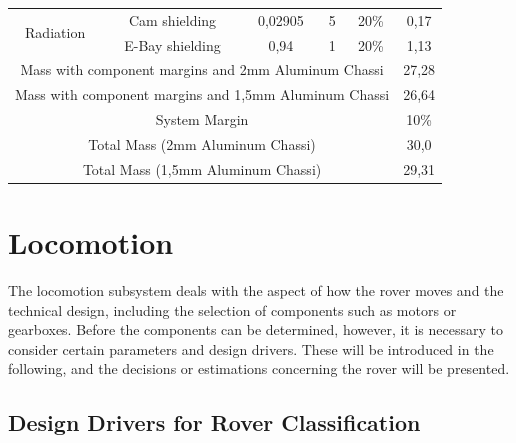\begin{table}[]
{\begin{tabular}{cccccc}
\multirow{2}{*}{Radiation}               & Cam shielding                       & 0,02905                     & 5        & 20\%             & 0,17           \\
                                         & E-Bay shielding                     & 0,94                        & 1        & 20\%             & 1,13           \\
\multicolumn{5}{c}{Mass with component margins and 2mm Aluminum Chassi}                                                                    & 27,28          \\
\multicolumn{5}{c}{Mass with component margins and 1,5mm Aluminum Chassi}                                                                  & 26,64          \\
\multicolumn{5}{c}{System Margin}                                                                                                          & 10\%           \\
\multicolumn{5}{c}{Total Mass (2mm Aluminum Chassi)}                                                                                       & 30,0           \\
\multicolumn{5}{c}{Total Mass (1,5mm Aluminum Chassi)}                                                                                     & 29,31          \\\hline
\end{tabular}%
}
\end{table}

\section{Locomotion} \label{sec:locomotion}

The locomotion subsystem deals with the aspect of how the rover moves and the technical design, including the selection of components such as motors or gearboxes. Before the components can be determined, however, it is necessary to consider certain parameters and design drivers. These will be introduced in the following, and the decisions or estimations concerning the rover will be presented.

\subsection{Design Drivers for Rover Classification}
\label{sec:DesignDriversLoco}

